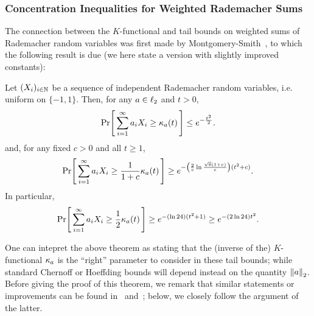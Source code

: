 \subsubsection{Concentration Inequalities for Weighted Rademacher  Sums}
 The connection between the $K$-functional and tail bounds on weighted sums of Rademacher random variables was first made by Montgomery-Smith~\cite{MS:90}, to which the following result is due (we here state a version with slightly improved constants):
\begin{theorem}\label{theo:bounds:rademacher:kf}
Let $(X_i)_{i\in\N}$ be a sequence of independent Rademacher random variables, i.e. uniform on $\{-1,1\}$. Then, for any $a\in\lp[2]$ and $t > 0$,
\begin{equation}\label{eq:bounds:rademacher:kf:ub}
  \probaOf{ \sum_{i=1}^\infty a_i X_i \geq \kf{a}(t) } \leq e^{-\frac{t^2}{2} }.
\end{equation}
and, for any fixed $c>0$ and all $t\geq 1$,
\begin{equation}\label{eq:bounds:rademacher:kf:lb}
    \probaOf{ \sum_{i=1}^\infty a_i X_i \geq \frac{1}{1+c}\kf{a}(t) } \geq e^{-\left( \frac{2}{c}\ln\frac{\sqrt{6}(1+c)}{c}\right) (t^2+c) }.
\end{equation}
In particular,
\[
    \probaOf{ \sum_{i=1}^\infty a_i X_i \geq \frac{1}{2}\kf{a}(t) } \geq e^{-\left( \ln 24 \right) (t^2+1) } \geq e^{-\left( 2\ln 24 \right)t^2 }.
\]
\end{theorem}
One can intepret the above theorem as stating that the (inverse of the) $K$-functional $\kf{a}$ is the ``right'' parameter to consider in these tail bounds; while standard Chernoff or Hoeffding bounds will depend instead on the quantity $\normtwo{a}$. Before giving the proof of this theorem, we remark that similar statements or improvements can be found in~\cite{HK:94} and~\cite{Astashkin:2010}; below, we closely follow the argument of the latter.

